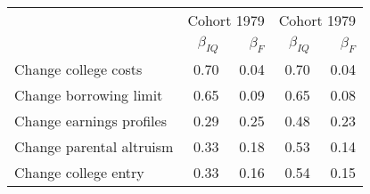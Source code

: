 \begin{tabular}{lrrrr}
\hline
   & \multicolumn{2}{|c|}{Cohort 1979} & \multicolumn{2}{|c|}{Cohort 1979} \\ 
 & $\beta_{IQ}$  & $\beta_{F}$  & $\beta_{IQ}$  & $\beta_{F}$  \\ 
\hline
Change college costs & 0.70  & 0.04  & 0.70  & 0.04  \\ 
Change borrowing limit & 0.65  & 0.09  & 0.65  & 0.08  \\ 
Change earnings profiles & 0.29  & 0.25  & 0.48  & 0.23  \\ 
Change parental altruism & 0.33  & 0.18  & 0.53  & 0.14  \\ 
Change college entry & 0.33  & 0.16  & 0.54  & 0.15  \\ 
\hline
\end{tabular}%
